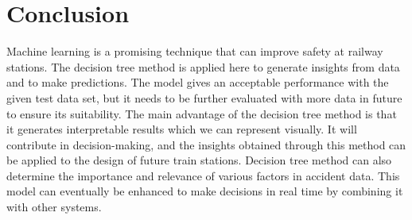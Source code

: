 \chapter*{Conclusion}

Machine learning is a promising technique that can improve safety at railway stations. The decision tree method is applied here to generate insights from data and to make predictions. The model gives an acceptable performance with the given test data set, but it needs to be further evaluated with more data in future to ensure its suitability. The main advantage of the decision tree method is that it generates interpretable results which we can represent visually. It will contribute in decision-making, and the insights obtained through this method can be applied to the design of future train stations. Decision tree method can also determine the importance and relevance of various factors in accident data. This model can eventually be enhanced to make decisions in real time by combining it with other systems. 